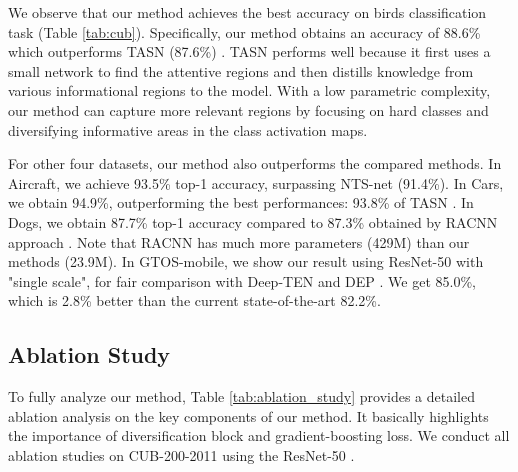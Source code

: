 \documentclass[letterpaper]{article} \usepackage{aaai20}  \usepackage{times}  \usepackage{helvet} \usepackage{courier}  \usepackage[hyphens]{url}  \usepackage{graphicx} \usepackage{multirow}
\begin{document}
We observe that our method achieves the best accuracy on birds classification task (Table \ref{tab:cub}). Specifically, our method obtains an accuracy of 88.6\% which outperforms TASN (87.6\%) \cite{zheng2019looking}. TASN \cite{zheng2019looking} performs well because it first uses a small network to find the attentive regions and then distills knowledge from various informational regions to the model. With a low parametric complexity, our method can capture more relevant regions by focusing on hard classes and diversifying informative areas in the class activation maps.


For other four datasets, our method also outperforms the compared methods. In Aircraft, we achieve 93.5\% top-1 accuracy, surpassing NTS-net \cite{nts_2018} (91.4\%). In Cars, we obtain 94.9\%, outperforming the best performances: 93.8\% of TASN \cite{zheng2019looking}. In Dogs, we obtain 87.7\% top-1 accuracy compared to 87.3\% obtained by RACNN approach \cite{racnn_2017}. Note that RACNN has much more parameters (429M) than our methods (23.9M). In GTOS-mobile, we show our result using ResNet-50 with "single scale", for fair comparison with  Deep-TEN \cite{zhang2017deep} and DEP \cite{dataset_gtosmobile}. We get 85.0\%, which is 2.8\% better than the current state-of-the-art 82.2\%.

\begin{table}[h]
\centering
{}
\caption{Experimental results on GTOS-mobile.}
\label{tab:gtos}
\end{table}

\subsection{Ablation Study}
To fully analyze our method, Table \ref{tab:ablation_study} provides a detailed ablation analysis on the key components of our method. It basically highlights the importance of diversification block and gradient-boosting loss. We conduct all ablation studies on CUB-200-2011 using the ResNet-50 \cite{resnet_2016}.
\end{document}
